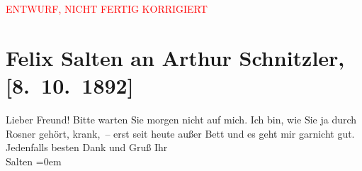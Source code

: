 
\begin{center}
            \textcolor{red}{ENTWURF, NICHT FERTIG KORRIGIERT}
                      \end{center}
            
         
         \renewcommand{\erwaehntePersonen}{Personen: Karl Peter Rosner}
         \renewcommand{\erwaehnteOrte}{Orte: Wien}
         \renewcommand{\erwaehnteWerke}{}
               \section[Felix Salten an Arthur Schnitzler, {[}8. 10. 1892{]}]{ Felix Salten an Arthur Schnitzler, {[}8. 10. 1892{]}}\nopagebreak{}\rehead{ }\begin{ledgroupsized}[t]{13cm}\normalsize\beginnumbering \toendnotes[C]{\smallbreak\pagebreak[2]} 
\toendnotes[C]{\smallbreak}\pstart
           \noindent{}{\pb}Lieber Freund! Bitte warten Sie morgen nicht auf mich. Ich bin, wie
               Sie ja \label{K_L03115-1v}\label{K_L03115-1h} durch
                  Rosner gehört, krank, – erst seit heute
               außer Bett und es geht mir garnicht gut. \pend
           \pstart
           Jedenfalls besten Dank und Gruß \pend
           \pstart
           Ihr {\\[\baselineskip]}\spacefill\mbox{Salten}\pend
           \leftskip=0em{}
         
         \endnumbering{}\end{ledgroupsized}\begin{anhang}\end{anhang}\newcommand{\dateiname}{L03115}\newcommand{\titel}{Felix Salten an Arthur Schnitzler, [8. 10. 1892]}\newcommand{\editorInnen}{Martin Anton Müller und Laura Untner}
      